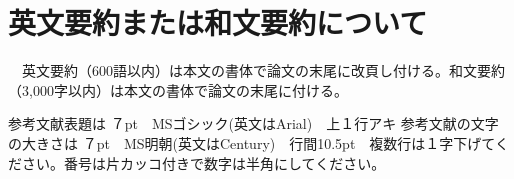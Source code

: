 \documentclass[base=10pt,magstyle=real,a4paper,twocolumn,xelatex,pandoc,jafont=ms]{bxjsarticle}
\begin{document}
\section{英文要約または和文要約について}
　英文要約（600語以内）は本文の書体で論文の末尾に改頁し付ける。和文要約（3,000字以内）は本文の書体で論文の末尾に付ける。


\vspace{1\Cvs}
\begin{thebibliography}{9}
		参考文献表題は ７pt　MSゴシック(英文はArial)　上１行アキ
		参考文献の文字の大きさは ７pt　MS明朝(英文はCentury)　行間10.5pt　複数行は１字下げてください。番号は片カッコ付きで数字は半角にしてください。


\end{thebibliography}
\vspace{1\Cvs}
\theendnotes
\end{document}
